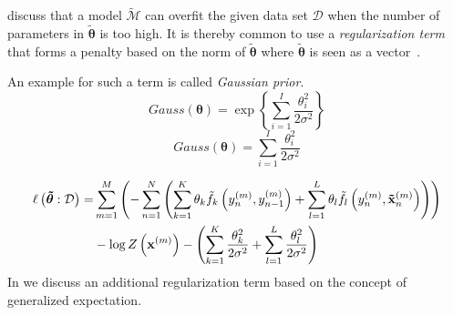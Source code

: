 \bigskip

\citet{sutton2010introduction} discuss that a model $\tilde{\mathcal{M}}$ can overfit the given data set $\mathcal{D}$ when the number of parameters in $\bm{\tilde{\theta}}$ is too high.
It is thereby common to use a \textit{regularization term} that forms a penalty based on the norm of $\bm{\tilde{\theta}}$ where $\bm{\tilde{\theta}}$ is seen as a vector~\citep{koller2009probabilistic,sutton2010introduction}.

An example for such a term is called \textit{Gaussian prior}.
\begin{equation}
  \label{equ:gaussian-prior}
  Gauss(\bm{\theta})=\exp\left\{\sum_{i=1}^I\frac{\theta_i^2}{2\sigma^2}\right\}
\end{equation}
\begin{equation}
  \label{equ:gaussian-prior}
  Gauss(\bm{\theta})=\sum_{i=1}^I\frac{\theta_i^2}{2\sigma^2}
\end{equation}

\begin{equation}
  \label{equ:log-likelihood-linear-chain-crf-log-linear-gaussian}
  \begin{split}
    \ell\left(\bm{\tilde{\theta}}:\mathcal{D}\right) = & \sum_{m=1}^M \left(-\sum_{n=1}^N \left(\sum_{k=1}^K\theta_k \tilde{f}_k\left(\vphantom{\tilde{x}}y_n^{(m)},y_{n-1}^{(m)}\right)+\sum_{l=1}^L\theta_l \tilde{f}_l\left(y_n^{(m)},\mathbf{\tilde{x}}_n^{(m)}\right)\right)\right) \\
    & -\log Z\left(\mathbf{x}^{(m)}\right)-\left(\sum_{k=1}^K\frac{\theta_k^2}{2\sigma^2}+\sum_{l=1}^L\frac{\theta_l^2}{2\sigma^2}\right)
 \end{split}
\end{equation}
In  we discuss an additional regularization term based on the concept of \gls{generalized expectation}.

\bigskip

